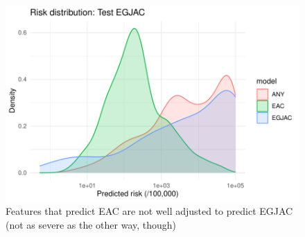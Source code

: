 \documentclass[12pt]{article}
\begin{document}
\begin{figure}
\begin{center}
\includegraphics[width=\textwidth]{figures/risk_testEGJAC.pdf}
\caption{Features that predict EAC are not well adjusted to predict EGJAC (not as severe as the other way, though)}
\end{center}
\end{figure}
\end{document}
